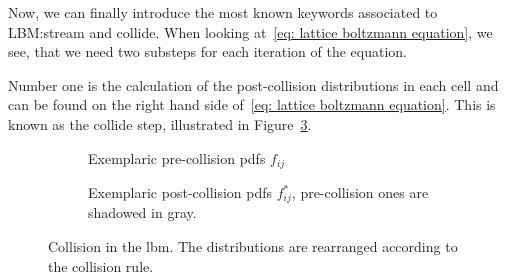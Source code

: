 Now, we can finally introduce the most known keywords associated to LBM:\@ stream and collide.
When looking at~\eqref{eq: lattice boltzmann equation}, we see, that we need two substeps for each iteration of the equation.

Number one is the calculation of the post-collision distributions in each cell and can be found on the right hand side of~\eqref{eq: lattice boltzmann equation}. This is known as the collide step, illustrated in Figure~\ref{fig: examplary collision}.

\begin{figure}
\centering
\begin{subfigure}{.5\textwidth}
  \centering

\caption{Exemplaric pre-collision \glspl{pdf} $f_{ij}$\linebreak}
\label{fig: pre-collision example}
\end{subfigure}%
\begin{subfigure}{.5\textwidth}
  \centering
\caption{Exemplaric post-collision \glspl{pdf} $f_{ij}^*$, pre-collision ones are shadowed in gray.}
\label{fig: post-collision example}
\end{subfigure}
\caption{Collision in the \gls{lbm}. The distributions are rearranged according to the collision rule.}
\label{fig: examplary collision}
\end{figure}

